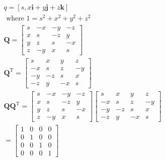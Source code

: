     $$
        \begin{aligned}
             & q=[s, x \mathbf{i}+y \mathbf{j}+z \mathbf{k}]                                                                     \\
             & \text { where } 1=s^{2}+x^{2}+y^{2}+z^{2}                                                                         \\
             & \mathbf{Q}=\left[\begin{array}{rrrr}
                    s & -x & -y & -z \\
                    x & s  & -z & y  \\
                    y & z  & s  & -x \\
                    z & -y & x  & s
                \end{array}\right]                                                                \\
             & \mathbf{Q}^{\mathrm{T}}=\left[\begin{array}{rrrr}
                    s  & x  & y  & z  \\
                    -x & s  & z  & -y \\
                    -y & -z & s  & x  \\
                    -z & y  & -x & s
                \end{array}\right]                                                   \\
             & \mathbf{Q} \mathbf{Q}^{\mathrm{T}}=\left[\begin{array}{rrrr}
                    s & -x & -y & -z \\
                    x & s  & -z & y  \\
                    y & z  & s  & -x \\
                    z & -y & x  & s
                \end{array}\right]\left[\begin{array}{rrrr}
                    s  & x  & y  & z  \\
                    -x & s  & z  & -y \\
                    -y & -z & s  & x  \\
                    -z & y  & -x & s
                \end{array}\right] \\
             & =\left[\begin{array}{llll}
                    1 & 0 & 0 & 0 \\
                    0 & 1 & 0 & 0 \\
                    0 & 0 & 1 & 0 \\
                    0 & 0 & 0 & 1
                \end{array}\right]
        \end{aligned}
    $$

